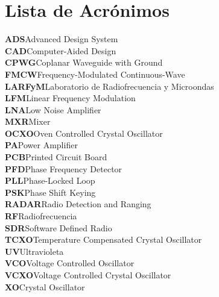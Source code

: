 \chapter*{Lista de Acrónimos} 
\noindent\textbf{ADS}{Advanced Design System}\\
\textbf{CAD}{Computer-Aided Design}\\
\textbf{CPWG}{Coplanar Waveguide with Ground}\\
\textbf{FMCW}{Frequency-Modulated Continuous-Wave}\\
\textbf{LARFyM}{Laboratorio de Radiofrecuencia y Microondas}\\
\textbf{LFM}{Linear Frequency Modulation}\\
\textbf{LNA}{Low Noise Amplifier}\\
\textbf{MXR}{Mixer}\\
\textbf{OCXO}{Oven Controlled Crystal Oscillator}\\
\textbf{PA}{Power Amplifier}\\
\textbf{PCB}{Printed Circuit Board}\\
\textbf{PFD}{Phase Frequency Detector}\\
\textbf{PLL}{Phase-Locked Loop}\\
\textbf{PSK}{Phase Shift Keying}\\
\textbf{RADAR}{Radio Detection and Ranging}\\
\textbf{RF}{Radiofrecuencia}\\
\textbf{SDR}{Software Defined Radio}\\
\textbf{TCXO}{Temperature Compensated Crystal Oscillator}\\
\textbf{UV}{Ultravioleta}\\
\textbf{VCO}{Voltage Controlled Oscillator}\\
\textbf{VCXO}{Voltage Controlled Crystal Oscillator}\\
\textbf{XO}{Crystal Oscillator}